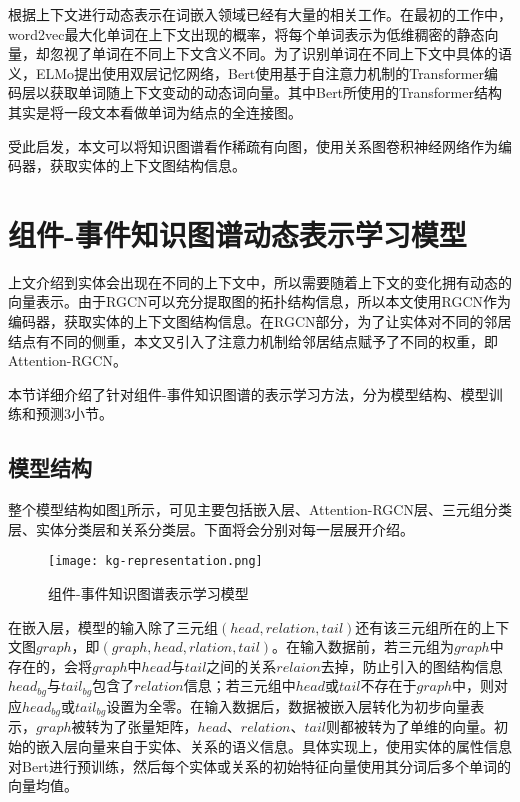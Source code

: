 根据上下文进行动态表示在词嵌入领域已经有大量的相关工作。在最初的工作中，word2vec\cite{mikolov2013efficient}最大化单词在上下文出现的概率，将每个单词表示为低维稠密的静态向量，却忽视了单词在不同上下文含义不同。为了识别单词在不同上下文中具体的语义，ELMo\cite{peters2018deep}提出使用双层记忆网络，Bert\cite{devlin2018bert}使用基于自注意力机制的Transformer\cite{vaswani2017attention}编码层以获取单词随上下文变动的动态词向量。其中Bert所使用的Transformer结构其实是将一段文本看做单词为结点的全连接图。

受此启发，本文可以将知识图谱看作稀疏有向图，使用关系图卷积神经网络作为编码器，获取实体的上下文图结构信息。

\section{组件-事件知识图谱动态表示学习模型}
上文介绍到实体会出现在不同的上下文中，所以需要随着上下文的变化拥有动态的向量表示。由于RGCN可以充分提取图的拓扑结构信息，所以本文使用RGCN作为编码器，获取实体的上下文图结构信息。在RGCN部分，为了让实体对不同的邻居结点有不同的侧重，本文又引入了注意力机制给邻居结点赋予了不同的权重，即Attention-RGCN。

本节详细介绍了针对组件-事件知识图谱的表示学习方法，分为模型结构、模型训练和预测3小节。
\subsection{模型结构}
整个模型结构如图\ref{kg-representation}所示，可见主要包括嵌入层、Attention-RGCN层、三元组分类层、实体分类层和关系分类层。下面将会分别对每一层展开介绍。
\begin{figure}[htbp]
    \centering
    \texttt{[image: kg-representation.png]}
    \caption{组件-事件知识图谱表示学习模型\label{kg-representation}}
\end{figure}

在嵌入层，模型的输入除了三元组$(head, relation, tail)$还有该三元组所在的上下文图$graph$，即$(graph, head,rlation,tail)$。在输入数据前，若三元组为$graph$中存在的，会将$graph$中$head$与$tail$之间的关系$relaion$去掉，防止引入的图结构信息$head_{bg}$与$tail_{bg}$包含了$relation$信息；若三元组中$head$或$tail$不存在于$graph$中，则对应$head_{bg}$或$tail_{bg}$设置为全零。在输入数据后，数据被嵌入层转化为初步向量表示，$graph$被转为了张量矩阵，$head$、$relation$、$tail$则都被转为了单维的向量。初始的嵌入层向量来自于实体、关系的语义信息。具体实现上，使用实体的属性信息对Bert\cite{devlin2018bert}进行预训练，然后每个实体或关系的初始特征向量使用其分词后多个单词的向量均值。

